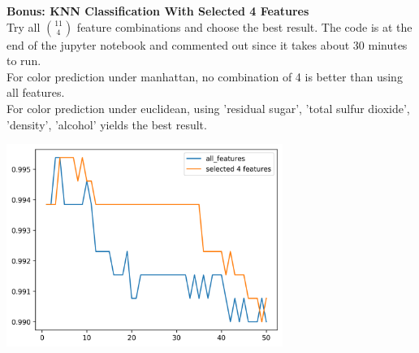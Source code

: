 \documentclass[12pt]{article}
\begin{document}
\begin{figure}[H]
\captionsetup[subfigure]{labelformat=empty}
\centering
{}
\end{figure}
\noindent
\textbf{Bonus: KNN Classification With Selected 4 Features}\\
Try all ${11 \choose 4}$ feature combinations and choose the best result. The code is at the end of the jupyter notebook and commented out since it takes about 30 minutes to run.\\
For color prediction under manhattan, no combination of 4 is better than using all features.\\
For color prediction under euclidean, using 'residual sugar', 'total sulfur dioxide', 'density', 'alcohol' yields the best result.
\begin{center}
    \includegraphics[width=9cm]{../select4features/color_e.png}
\end{center}
\end{document}
